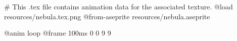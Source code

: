 # This .tex file contains animation data for the associated texture.
@load resources/nebula.tex.png
@from-aseprite resources/nebula.aseprite

@anim loop
	@frame 100ms 0 0 9 9
